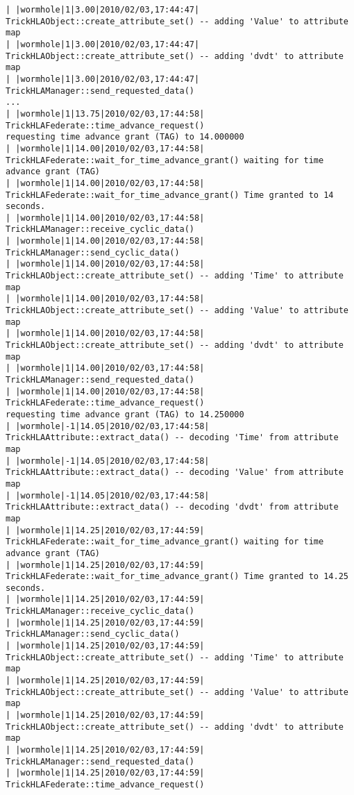 \begin{lstlisting}[numbers=none,caption={output showing conditionally sent cyclic data}]
| |wormhole|1|3.00|2010/02/03,17:44:47| TrickHLAObject::create_attribute_set() -- adding 'Value' to attribute map
| |wormhole|1|3.00|2010/02/03,17:44:47| TrickHLAObject::create_attribute_set() -- adding 'dvdt' to attribute map
| |wormhole|1|3.00|2010/02/03,17:44:47| TrickHLAManager::send_requested_data()
...
| |wormhole|1|13.75|2010/02/03,17:44:58| TrickHLAFederate::time_advance_request()   
requesting time advance grant (TAG) to 14.000000
| |wormhole|1|14.00|2010/02/03,17:44:58| TrickHLAFederate::wait_for_time_advance_grant() waiting for time advance grant (TAG)
| |wormhole|1|14.00|2010/02/03,17:44:58| TrickHLAFederate::wait_for_time_advance_grant() Time granted to 14 seconds.
| |wormhole|1|14.00|2010/02/03,17:44:58| TrickHLAManager::receive_cyclic_data()
| |wormhole|1|14.00|2010/02/03,17:44:58| TrickHLAManager::send_cyclic_data()
| |wormhole|1|14.00|2010/02/03,17:44:58| TrickHLAObject::create_attribute_set() -- adding 'Time' to attribute map
| |wormhole|1|14.00|2010/02/03,17:44:58| TrickHLAObject::create_attribute_set() -- adding 'Value' to attribute map
| |wormhole|1|14.00|2010/02/03,17:44:58| TrickHLAObject::create_attribute_set() -- adding 'dvdt' to attribute map
| |wormhole|1|14.00|2010/02/03,17:44:58| TrickHLAManager::send_requested_data()
| |wormhole|1|14.00|2010/02/03,17:44:58| TrickHLAFederate::time_advance_request()   
requesting time advance grant (TAG) to 14.250000
| |wormhole|-1|14.05|2010/02/03,17:44:58| TrickHLAAttribute::extract_data() -- decoding 'Time' from attribute map
| |wormhole|-1|14.05|2010/02/03,17:44:58| TrickHLAAttribute::extract_data() -- decoding 'Value' from attribute map
| |wormhole|-1|14.05|2010/02/03,17:44:58| TrickHLAAttribute::extract_data() -- decoding 'dvdt' from attribute map
| |wormhole|1|14.25|2010/02/03,17:44:59| TrickHLAFederate::wait_for_time_advance_grant() waiting for time advance grant (TAG)
| |wormhole|1|14.25|2010/02/03,17:44:59| TrickHLAFederate::wait_for_time_advance_grant() Time granted to 14.25 seconds.
| |wormhole|1|14.25|2010/02/03,17:44:59| TrickHLAManager::receive_cyclic_data()
| |wormhole|1|14.25|2010/02/03,17:44:59| TrickHLAManager::send_cyclic_data()
| |wormhole|1|14.25|2010/02/03,17:44:59| TrickHLAObject::create_attribute_set() -- adding 'Time' to attribute map
| |wormhole|1|14.25|2010/02/03,17:44:59| TrickHLAObject::create_attribute_set() -- adding 'Value' to attribute map
| |wormhole|1|14.25|2010/02/03,17:44:59| TrickHLAObject::create_attribute_set() -- adding 'dvdt' to attribute map
| |wormhole|1|14.25|2010/02/03,17:44:59| TrickHLAManager::send_requested_data()
| |wormhole|1|14.25|2010/02/03,17:44:59| TrickHLAFederate::time_advance_request()   

\end{lstlisting}
